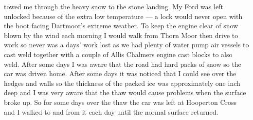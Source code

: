 towed me through the heavy snow to the stone landing. My Ford was left unlocked
because of the extra low temperature --- a lock would never open with the boot
facing Dartmoor's extreme weather. To keep the engine clear of snow blown by
the wind each morning I would walk from Thorn Moor then drive to work so never
was a days' work lost as we had plenty of water pump air vessels to cast weld
together with a couple of Allis Chalmers engine cast blocks to also weld. After
some days I was aware that the road had hard packs of snow so the car was
driven home. After some days it was noticed that I could see over the hedges
and walls so the thickness of the packed ice was approximately one inch deep
and I was very aware that the thaw would cause problems when the surface broke
up. So for some days over the thaw the car was left at Hooperton Cross and I
walked to and from it each day until the normal surface returned.
